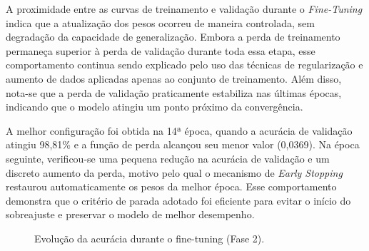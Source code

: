 \documentclass[portuguese]{sbc2025}%
\begin{document}
A proximidade entre as curvas de treinamento e validação durante o \textit{Fine-Tuning} indica que a atualização dos pesos ocorreu de
maneira controlada, sem degradação da capacidade de generalização. Embora a perda de treinamento permaneça superior à perda de 
validação durante toda essa etapa, esse comportamento continua sendo explicado pelo uso das técnicas de regularização e aumento de 
dados aplicadas apenas ao conjunto de treinamento. Além disso, nota-se que a perda de validação praticamente estabiliza nas 
últimas épocas, indicando que o modelo atingiu um ponto próximo da convergência.

A melhor configuração foi obtida na 14ª época, quando a acurácia de validação atingiu 98,81\% e a função de perda alcançou seu menor 
valor (0,0369). Na época seguinte, verificou-se uma pequena redução na acurácia de validação e um discreto aumento da perda, motivo 
pelo qual o mecanismo de \textit{Early Stopping} restaurou automaticamente os pesos da melhor época. Esse comportamento demonstra que 
o critério de parada adotado foi eficiente para evitar o início do sobreajuste e preservar o modelo de melhor desempenho.

\begin{figure}[ht]
\centering
{}
\caption{Evolução da acurácia durante o fine-tuning (Fase 2).}
\label{fig:accuracy_fase2}
\end{figure}
\end{document}
